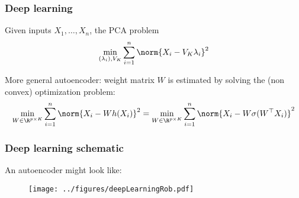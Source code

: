 \documentclass[12pt]{beamer}
\begin{document}
\begin{frame}[fragile]
\frametitle{Deep learning}
 Given inputs $X_1,\ldots,X_n$, the PCA  problem
\[
\min_{(\lambda_i),V_K} \sum_{i=1}^n \norm{X_i  - V_K \lambda_i}^2
\]
\vsp

More general autoencoder:  weight matrix $W$ is estimated by solving the (non convex) optimization problem:
\[
\min_{W \in \R^{p\times K}} \sum_{i=1}^n \norm{X_i -Wh(X_i)}^2
=
\min_{W \in \R^{p\times K}} \sum_{i=1}^n \norm{X_i -W\sigma(W^{\top} X_i)}^2
\]



\end{frame}
%
%
%
%
%
%
%
%
%
%
%
%
%
%
%
\begin{frame}[fragile]
\frametitle{Deep learning schematic}
An autoencoder might look like:
\begin{figure}
\centering
\texttt{[image: ../figures/deepLearningRob.pdf]}
\end{figure}
\end{frame}
\end{document}
